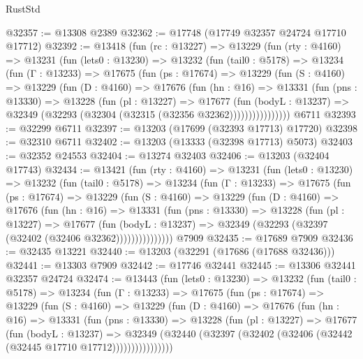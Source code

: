 \begin{lexlean}{RustStd}
\begin{coremodule}
@32357 := @13308 @2389
@32362 := @17748 (@17749 @32357 @24724 @17710 @17712)
@32392 := @13418
    (fun (rc : @13227) =>
    @13229
      (fun (rty : @4160) =>
      @13231
        (fun (lets0 : @13230) =>
        @13232
          (fun (tail0 : @5178) =>
          @13234
            (fun (Γ : @13233) =>
            @17675
              (fun (ps : @17674) =>
              @13229
                (fun (S : @4160) =>
                @13229
                  (fun (D : @4160) =>
                  @17676
                    (fun (hn : @16) =>
                    @13331
                      (fun (pns : @13330) =>
                      @13228
                        (fun (pl : @13227) =>
                        @17677
                          (fun (bodyL : @13237) =>
                          @32349 (@32293 (@32304 (@32315 (@32356 @32362))))))))))))))))
    @6711
@32393 := @32299 @6711
@32397 := @13203 (@17699 (@32393 @17713) @17720)
@32398 := @32310 @6711
@32402 := @13203 (@13333 (@32398 @17713) @5073)
@32403 := @32352 @24553
@32404 := @13274 @32403
@32406 := @13203 (@32404 @17743)
@32434 := @13421
    (fun (rty : @4160) =>
    @13231
      (fun (lets0 : @13230) =>
      @13232
        (fun (tail0 : @5178) =>
        @13234
          (fun (Γ : @13233) =>
          @17675
            (fun (ps : @17674) =>
            @13229
              (fun (S : @4160) =>
              @13229
                (fun (D : @4160) =>
                @17676
                  (fun (hn : @16) =>
                  @13331
                    (fun (pns : @13330) =>
                    @13228
                      (fun (pl : @13227) =>
                      @17677
                        (fun (bodyL : @13237) =>
                        @32349 (@32293 (@32397 (@32402 (@32406 @32362)))))))))))))))
    @7909
@32435 := @17689 @7909
@32436 := @32435 @13221
@32440 := @13203 (@32291 (@17686 (@17688 @32436)))
@32441 := @13303 @7909
@32442 := @17746 @32441
@32445 := @13306 @32441 @32357 @24724
@32474 := @13443
    (fun (lets0 : @13230) =>
    @13232
      (fun (tail0 : @5178) =>
      @13234
        (fun (Γ : @13233) =>
        @17675
          (fun (ps : @17674) =>
          @13229
            (fun (S : @4160) =>
            @13229
              (fun (D : @4160) =>
              @17676
                (fun (hn : @16) =>
                @13331
                  (fun (pns : @13330) =>
                  @13228
                    (fun (pl : @13227) =>
                    @17677
                      (fun (bodyL : @13237) =>
                      @32349
                        (@32440
                          (@32397 (@32402 (@32406 (@32442 (@32445 @17710 @17712))))))))))))))))

\end{coremodule}
\end{lexlean}
